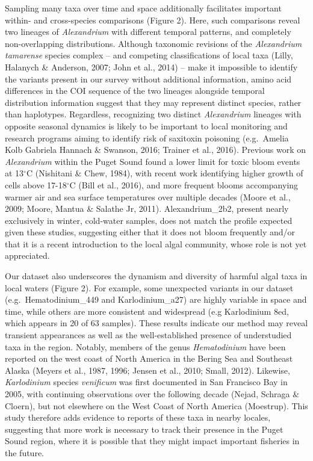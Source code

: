 \documentclass[
]{article}
\begin{document}
Sampling many taxa over time and space additionally facilitates
important within- and cross-species comparisons (Figure 2). Here, such
comparisons reveal two lineages of \emph{Alexandrium} with different
temporal patterns, and completely non-overlapping distributions.
Although taxonomic revisions of the \emph{Alexandrium tamarense} species
complex -- and competing classifications of local taxa (Lilly, Halanych
\& Anderson, 2007; John et al., 2014) -- make it impossible to identify
the variants present in our survey without additional information, amino
acid differences in the COI sequence of the two lineages alongside
temporal distribution information suggest that they may represent
distinct species, rather than haplotypes. Regardless, recognizing two
distinct \emph{Alexandrium} lineages with opposite seasonal dynamics is
likely to be important to local monitoring and research programs aiming
to identify risk of saxitoxin poisoning (e.g.~Amelia Kolb Gabriela
Hannach \& Swanson, 2016; Trainer et al., 2016). Previous work on
\emph{Alexandrium} within the Puget Sound found a lower limit for toxic
bloom events at 13\(^\circ\)C (Nishitani \& Chew, 1984), with recent
work identifying higher growth of cells above 17-18\(^\circ\)C (Bill et
al., 2016), and more frequent blooms accompanying warmer air and sea
surface temperatures over multiple decades (Moore et al., 2009; Moore,
Mantua \& Salathe Jr, 2011). Alexandrium\_2b2, present nearly
exclusively in winter, cold-water samples, does not match the profile
expected given these studies, suggesting either that it does not bloom
frequently and/or that it is a recent introduction to the local algal
community, whose role is not yet appreciated.

Our dataset also underscores the dynamism and diversity of harmful algal
taxa in local waters (Figure 2). For example, some unexpected variants
in our dataset (e.g.~Hematodinium\_449 and Karlodinium\_a27) are highly
variable in space and time, while others are more consistent and
widespread (e.g Karlodinium 8ed, which appears in 20 of 63 samples).
These results indicate our method may reveal transient appearances as
well as the well-established presence of understudied taxa in the
region. Notably, members of the genus \emph{Hematodinium} have been
reported on the west coast of North America in the Bering Sea and
Southeast Alaska (Meyers et al., 1987, 1996; Jensen et al., 2010; Small,
2012). Likewise, \emph{Karlodinium} species \emph{venificum} was first
documented in San Francisco Bay in 2005, with continuing observations
over the following decade (Nejad, Schraga \& Cloern), but not elsewhere
on the West Coast of North America (Moestrup). This study therefore adds
evidence to reports of these taxa in nearby locales, suggesting that
more work is necessary to track their presence in the Puget Sound
region, where it is possible that they might impact important fisheries
in the future.
\end{document}
